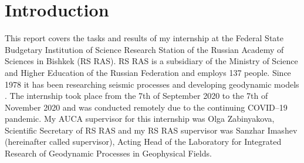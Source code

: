 \documentclass[../00_main.tex]{subfiles}
\begin{document}
\section{Introduction}

This report covers the tasks and results of my internship at the 
Federal State
Budgetary Institution of Science Research Station of the Russian Academy of 
Sciences in Bishkek (RS RAS). RS RAS is a subsidiary of the Ministry of Science 
and Higher Education of the Russian Federation and employs 137 people. Since 
1978 it has been researching seismic processes and developing geodynamic
models \cite{rsras-website}. 
The internship took place from the 7th of September 2020 to the 7th of November 2020 and was conducted remotely due to
the continuing COVID--19 pandemic. My AUCA supervisor for this internship was
Olga Zabinyakova, Scientific Secretary of RS RAS and my RS RAS supervisor was
Sanzhar Imashev (hereinafter called supervisor), Acting Head of the Laboratory for Integrated Research of
Geodynamic Processes in Geophysical Fields.\newline
\end{document}
